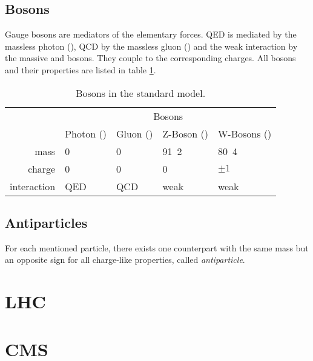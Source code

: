 \subsection{Bosons}
Gauge bosons are mediators of the elementary forces. QED is mediated by the massless photon (\Pphoton), QCD by the massless gluon (\Pgluon) and the weak interaction by the massive \PZ and \PWpm bosons. They couple to the corresponding charges.
All bosons and their properties are listed in table \ref{tbl:sm_bosons}.

\begin{table}[htbp]
	\center
	\begin{tabular}{ r | l | l | l | l | }
		\cline{2-5}
		& \multicolumn{4}{c|}{Bosons} \\ \cline{2-5} 
		& Photon (\Pgamma) & Gluon (\Pgluon) & Z-Boson (\PZ) & W-Bosons (\PWpm) \\ \cline{2-5}
		mass & 0 & 0 & \unit{91.2}{\GeV} & \unit{80.4}{\GeV} \\ \cline{2-5}
		charge & 0 & 0 & 0 & $\pm 1$ \\ \cline{2-5}
		interaction & QED & QCD & weak & weak \\ \cline{2-5}
	\end{tabular}
	\caption{Bosons in the standard model\cite{PDG2014}.}
	\label{tbl:sm_bosons}
\end{table}

\subsection{Antiparticles}
For each mentioned particle, there exists one counterpart with the same mass but an opposite sign for all charge-like properties, called \emph{antiparticle}.

\section{LHC}

\section{CMS}

